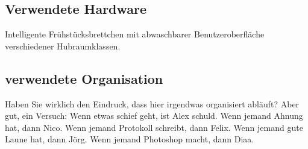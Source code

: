 \documentclass[11pt,a4paper]{article}
\begin{document}
\subsection{Verwendete Hardware}
Intelligente Frühstücksbrettchen mit abwaschbarer Benutzeroberfläche verschiedener Hubraumklassen.
\subsection{verwendete Organisation}
Haben Sie wirklich den Eindruck, dass hier irgendwas organisiert abläuft? 
Aber gut, ein Versuch: 
Wenn etwas schief geht, ist Alex schuld.
Wenn jemand Ahnung hat, dann Nico.
Wenn jemand Protokoll schreibt, dann Felix.
Wenn jemand gute Laune hat, dann Jörg.
Wenn jemand Photoshop macht, dann Diaa.




\pagebreak
\end{document}
